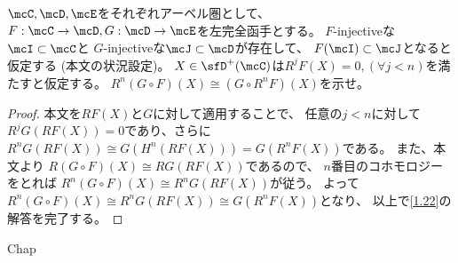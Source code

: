 \documentclass[uplatex,dvipdfmx]{jsarticle}
\begin{document}
\maketitle\HeaderCommentA
\section{}
\fi


\begin{prob}\label{1.22}
  \(\mcC,\mcD,\mcE\)をそれぞれアーベル圏として、
  \(F:\mcC\to \mcD, G:\mcD\to \mcE\)を左完全函手とする。
  \(F\)-injectiveな\(\mcI\subset \mcC\)と
  \(G\)-injectiveな\(\mcJ\subset \mcD\)が存在して、
  \(F(\mcI)\subset \mcJ\)となると仮定する
  (本文\cite[Proposition 1.8.7]{kashiwara2002sheaves}の状況設定)。
  \(X\in \sfD^+(\mcC)\)は\(R^jF(X) = 0, (\forall j<n)\)を満たすと仮定する。
  \(R^n(G\circ F)(X) \cong (G\circ R^nF)(X)\)を示せ。
\end{prob}

\begin{proof}
  本文\cite[Remark 1.8.6]{kashiwara2002sheaves}を\(RF(X)\)と\(G\)に対して適用することで、
  任意の\(j<n\)に対して\(R^jG(RF(X)) = 0\)であり、さらに
  \(R^nG(RF(X)) \cong G(H^n(RF(X))) = G(R^nF(X))\)である。
  また、本文\cite[Proposition 1.8.7]{kashiwara2002sheaves}より
  \(R(G\circ F)(X) \cong RG(RF(X))\)であるので、
  \(n\)番目のコホモロジーをとれば
  \(R^n(G\circ F)(X) \cong R^nG(RF(X))\)が従う。
  よって\(R^n(G\circ F)(X) \cong R^nG(RF(X))\cong G(R^nF(X))\)となり、
  以上で\autoref{1.22}の解答を完了する。
\end{proof}




\ifcsname Chap\endcsname\else
\printbibliography
\end{document}
